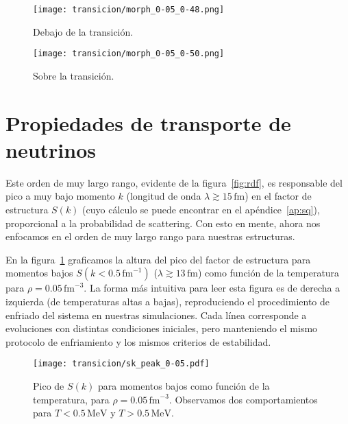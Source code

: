 \begin{figure*}[floatfix]%
  \centering
  \begin{subfigure}[h!]{0.48\columnwidth}
    \texttt{[image: transicion/morph\_0-05\_0-48.png]}
    \caption*{Debajo de la transición.}
  \end{subfigure}
  \begin{subfigure}[h!]{0.48\columnwidth}
    \texttt{[image: transicion/morph\_0-05\_0-50.png]}
    \caption*{Sobre la transición.}
  \end{subfigure}
  \caption{Distribución espacial para $\rho=0.05\,\text{fm}^{-3}$, tanto sobre como debajo de la temperatura de transición.
    Las estructuras son similares, pero mucho más desordenadas sobre la transición.}
  \label{fig:morph}
\end{figure*}

\section{Propiedades de transporte de neutrinos}
Este orden de muy largo rango, evidente de la figura~\ref{fig:rdf}, es responsable del pico a muy bajo momento $k$ (longitud de onda $\lambda\gtrsim 15\,\text{fm}$) en el factor de estructura $S(k)$ (cuyo cálculo se puede encontrar en el apéndice~\ref{ap:sq}), proporcional a la probabilidad de scattering.
Con esto en mente, ahora nos enfocamos en el orden de muy largo rango para nuestras estructuras.

En la figura~\ref{fig:sk_peak_0-05} graficamos la altura del pico del factor de estructura para momentos bajos $S(k<0.5\,\text{fm}^{-1})$ ($\lambda\gtrsim13\,\text{fm}$) como función de la temperatura para $\rho=0.05\,\text{fm}^{-3}$.
La forma más intuitiva para leer esta figura es de derecha a izquierda (de temperaturas altas a bajas), reproduciendo el procedimiento de enfriado del sistema en nuestras simulaciones.
Cada línea corresponde a evoluciones con distintas condiciones iniciales, pero manteniendo el mismo protocolo de enfriamiento y los mismos criterios de estabilidad.

\begin{figure}
  \centering
  \texttt{[image: transicion/sk\_peak\_0-05.pdf]}
  \caption{Pico de $S(k)$ para momentos bajos como función de la temperatura, para $\rho=0.05\,\text{fm}^{-3}$.
    Observamos dos comportamientos para $T<0.5\,\text{MeV}$ y $T>0.5\,\text{MeV}$.  }
  \label{fig:sk_peak_0-05}
\end{figure}

